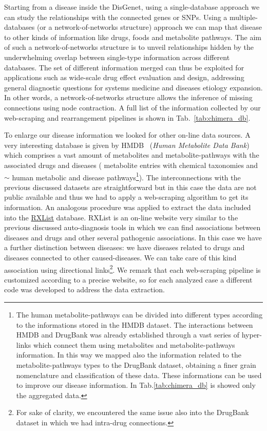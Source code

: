 \documentclass{standalone}
\begin{document}
Starting from a disease inside the DisGenet, using a single-database approach we can study the  relationships with the connected genes or SNPs.
Using a multiple-databases (or a network-of-networks structure) approach we can map that disease to other kinds of information like drugs, foods and metabolite pathways.
The aim of such a network-of-networks structure is to unveil relationships hidden by the underwhelming overlap between single-type information across different databases.
The set of different information merged can thus be exploited for applications such as wide-scale drug effect evaluation and design, addressing general diagnostic questions for systems medicine and diseases etiology expansion.
In other words, a network-of-networks structure allows the inference of missing connections using node contraction.
A full list of the information collected by our \textsf{web-scraping} and rearrangement pipelines is shown in Tab.~\ref{tab:chimera_db}.

To enlarge our disease information we looked for other on-line data sources.
A very interesting database is given by HMDB~\cite{HMDB} (\emph{Human Metabolite Data Bank}) which comprises a vast amount of metabolites and metabolite-pathways with the associated drugs and diseases ( metabolite entries with chemical taxonomies and $\sim$ human metabolic and disease pathways\footnote{
  The human metabolite-pathways can be divided into different types according to the informations stored in the HMDB dataset.
  The interactions between HMDB and DrugBank was already established through a vast series of hyper-links which connect them using metabolites and metabolite-pathways information.
  In this way we mapped also the information related to the metabolite-pathways types to the DrugBank dataset, obtaining a finer grain nomenclature and classification of these data.
  These informations can be used to improve our disease information.
  In Tab.\ref{tab:chimera_db} is showed only the aggregated data.
}).
The interconnections with the previous discussed datasets are straightforward but in this case the data are not public available and thus we had to apply a \textsf{web-scraping} algorithm to get its information.
An analogous procedure was applied to extract the data included into the \href{https://www.rxlist.com/script/main/hp.asp}{RXList} database.
RXList is an on-line website very similar to the previous discussed auto-diagnosis tools in which we can find associations between diseases and drugs and other several pathogenic associations.
In this case we have a further distinction between diseases: we have diseases related to drugs and diseases connected to other caused-diseases.
We can take care of this kind association using directional links\footnote{
  For sake of clarity, we encountered the same issue also into the DrugBank dataset in which we had intra-drug connections.
}.
We remark that each \textsf{web-scraping} pipeline is customized according to a precise website, so for each analyzed case a different code was developed to address the data extraction.
\end{document}
